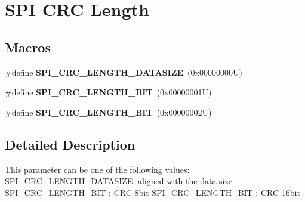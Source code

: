\hypertarget{group___s_p_i___c_r_c__length}{}\section{S\+PI C\+RC Length}
\label{group___s_p_i___c_r_c__length}
\subsection*{Macros}
\begin{DoxyCompactItemize}
\item 
\mbox{\label{group___s_p_i___c_r_c__length_ga2c09210b093323a8e84af832657568ce}} 
\#define {\bfseries S\+P\+I\+\_\+\+C\+R\+C\+\_\+\+L\+E\+N\+G\+T\+H\+\_\+\+D\+A\+T\+A\+S\+I\+ZE}~(0x00000000\+U)
\item 
\mbox{\label{group___s_p_i___c_r_c__length_ga9340cbde2576d63c53c3ee50d3303886}} 
\#define {\bfseries S\+P\+I\+\_\+\+C\+R\+C\+\_\+\+L\+E\+N\+G\+T\+H\+\_\+B\+IT}~(0x00000001\+U)
\item 
\mbox{\label{group___s_p_i___c_r_c__length_ga780edaa0a72a79c4d0fa9618541aaad8}} 
\#define {\bfseries S\+P\+I\+\_\+\+C\+R\+C\+\_\+\+L\+E\+N\+G\+T\+H\+\_\+B\+IT}~(0x00000002\+U)
\end{DoxyCompactItemize}


\subsection{Detailed Description}
This parameter can be one of the following values\+: S\+P\+I\+\_\+\+C\+R\+C\+\_\+\+L\+E\+N\+G\+T\+H\+\_\+\+D\+A\+T\+A\+S\+I\+ZE\+: aligned with the data size S\+P\+I\+\_\+\+C\+R\+C\+\_\+\+L\+E\+N\+G\+T\+H\+\_\+B\+IT \+: C\+RC 8bit S\+P\+I\+\_\+\+C\+R\+C\+\_\+\+L\+E\+N\+G\+T\+H\+\_\+B\+IT \+: C\+RC 16bit 